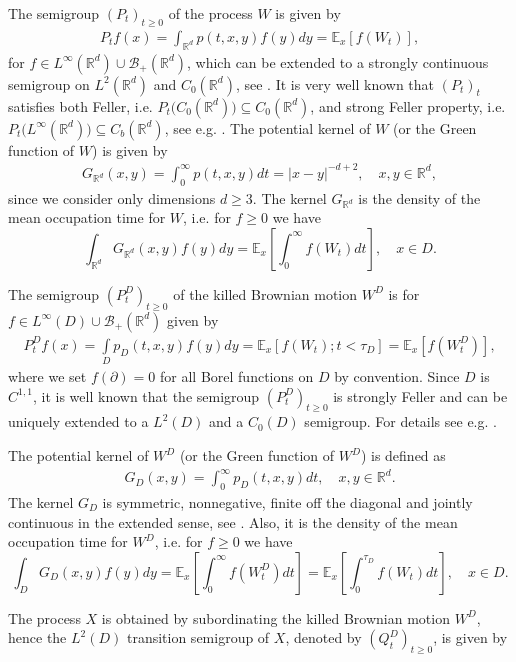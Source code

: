 \documentclass[12pt,a4paper,onecolumn]{amsart}
\theoremstyle{definition}
\newcommand{\R}{\mathbb{R}}
\newcommand{\ex}{\mathbb{E}}
\newcommand{\1}{\mathbf 1}
\newcommand{\BB}{\mathcal{B}}
\newcommand{\GD}{G_{ D}}
\numberwithin{equation}{section}
\begin{document}
The semigroup $(P_t)_{t\ge 0}$ of the process $W$ is given by
\begin{align}\label{eq:Brownian semigroup Rd}
	P_t f(x)=\int_{\R^d}p(t,x,y)f(y)dy=\ex_x[f(W_t)],
\end{align}
for  $f\in L^\infty(\R^d)\cup \BB_+(\R^d)$, which can be extended to a strongly continuous semigroup on $L^2(\R^d)$ and $C_0(\R^d)$, see \cite[Theorem 2.7]{chung_zhao}. It is very well known that $(P_t)_t$ satisfies both Feller, i.e. $P_t \big(C_0(\R^d)\big)\subseteq C_0(\R^d)$, and strong Feller property, i.e. $P_t \big(L^\infty(\R^d)\big)\subseteq C_b(\R^d)$, see  e.g. \cite[Section 1.1]{chung_zhao}. The potential kernel of $W$ (or the Green function of $W$) is given by
\begin{align*}
	G_{\R^d}(x,y)=\int_0^\infty p(t,x,y)dt=|x-y|^{-d+2},\quad x,y\in\R^d,
\end{align*}
since we consider only dimensions $d\ge 3$. The kernel $G_{\R^d}$ is the density of the mean occupation time for $W$, i.e. for $f\ge0$ we have
$$ \int_{\R^d} G_{\R^d}(x,y)f(y)dy=\ex_x\left[\int_0^\infty f(W_t)dt\right], \quad x\in D.$$

The semigroup $(P_t^D)_{t\ge 0}$ of the killed Brownian motion $W^D$ is for $f\in L^\infty(D)\cup \BB_+(\R^d)$ given by
\begin{align*}
	P_t^D f(x)=\int\limits_Dp_D(t,x,y)f(y)dy=\ex_x[f(W_t);t<\tau_D]=\ex_x[f(W^D_t)],
\end{align*}
where we set $f(\partial)=0$ for all Borel functions on $D$ by convention. Since $D$ is $C^{1,1}$, it is well known that the semigroup $(P_t^D)_{t\ge 0}$ is  strongly Feller and can be uniquely extended to a $L^2(D)$ and a $C_0(D)$ semigroup. For details see e.g. \cite[Chapter 2]{chung_zhao}. 


The potential kernel of $W^D$ (or the Green function of $W^D$) is defined as
\begin{align*}
	\GD(x,y)=\int_0^\infty p_D(t,x,y)dt,\quad x,y\in\R^d.
\end{align*}
The kernel $\GD$ is symmetric, nonnegative, finite off the diagonal and jointly continuous in the extended sense, see \cite[Theorem 2.6]{chung_zhao}. Also, it is the density of the mean occupation time for $W^D$, i.e. for $f\ge0$ we have
$$ \int_D \GD(x,y)f(y)dy=\ex_x\left[\int_0^\infty f(W^D_t)dt\right]=\ex_x\left[\int_0^{\tau_D} f(W_t)dt\right], \quad x\in D.$$

The process $X$ is obtained by subordinating the killed Brownian motion $W^D$, hence the $L^2(D)$ transition semigroup of $X$, denoted by $(Q_t^D)_{t\ge0}$, is given by
\end{document}
